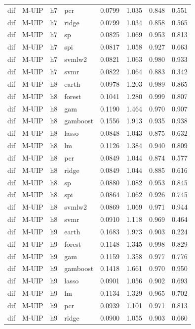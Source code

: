 \begin{ThreePartTable}
\begin{longtable}[t]{llclcccc}
dif & M-UIP & h7 & pcr & 0.0799 & 1.035 & 0.848 & 0.551\\
dif & M-UIP & h7 & ridge & 0.0799 & 1.034 & 0.858 & 0.565\\
dif & M-UIP & h7 & sp & 0.0825 & 1.069 & 0.953 & 0.813\\
dif & M-UIP & h7 & spi & 0.0817 & 1.058 & 0.927 & 0.663\\
dif & M-UIP & h7 & svmlw2 & 0.0821 & 1.063 & 0.980 & 0.933\\
dif & M-UIP & h7 & svmr & 0.0822 & 1.064 & 0.883 & 0.342\\
\addlinespace
dif & M-UIP & h8 & earth & 0.0978 & 1.203 & 0.989 & 0.865\\
dif & M-UIP & h8 & forest & 0.1041 & 1.280 & 0.999 & 0.807\\
dif & M-UIP & h8 & gam & 0.1190 & 1.464 & 0.970 & 0.907\\
dif & M-UIP & h8 & gamboost & 0.1556 & 1.913 & 0.935 & 0.938\\
dif & M-UIP & h8 & lasso & 0.0848 & 1.043 & 0.875 & 0.632\\
dif & M-UIP & h8 & lm & 0.1126 & 1.384 & 0.940 & 0.809\\
dif & M-UIP & h8 & pcr & 0.0849 & 1.044 & 0.874 & 0.577\\
dif & M-UIP & h8 & ridge & 0.0849 & 1.044 & 0.885 & 0.616\\
dif & M-UIP & h8 & sp & 0.0880 & 1.082 & 0.953 & 0.845\\
dif & M-UIP & h8 & spi & 0.0864 & 1.062 & 0.926 & 0.745\\
dif & M-UIP & h8 & svmlw2 & 0.0869 & 1.069 & 0.971 & 0.944\\
dif & M-UIP & h8 & svmr & 0.0910 & 1.118 & 0.969 & 0.464\\
\addlinespace
dif & M-UIP & h9 & earth & 0.1683 & 1.973 & 0.903 & 0.224\\
dif & M-UIP & h9 & forest & 0.1148 & 1.345 & 0.998 & 0.829\\
dif & M-UIP & h9 & gam & 0.1159 & 1.358 & 0.977 & 0.776\\
dif & M-UIP & h9 & gamboost & 0.1418 & 1.661 & 0.970 & 0.950\\
dif & M-UIP & h9 & lasso & 0.0901 & 1.056 & 0.902 & 0.693\\
dif & M-UIP & h9 & lm & 0.1134 & 1.329 & 0.965 & 0.702\\
dif & M-UIP & h9 & pcr & 0.0939 & 1.101 & 0.971 & 0.813\\
dif & M-UIP & h9 & ridge & 0.0900 & 1.055 & 0.903 & 0.660\\

\end{longtable}
\end{ThreePartTable}
